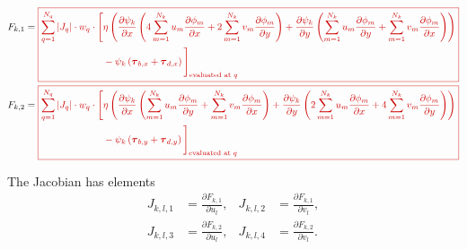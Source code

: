 \documentclass{amsart}
\newcommand{\diff}[2]{\ensuremath{\frac{\partial #1}{\partial #2}}}
\newcommand{\sumQ}{\ensuremath{\sum_{q = 1}^{N_q}}}
\newcommand{\diffbasisexpansion}[3]{\ensuremath{\sum_{#3 = 1}^{N_k} {#1}_{#3} \diff{\phi_{#3}}{#2} }}
\newcommand{\UX}{\diffbasisexpansion{u}{x}{m}}
\newcommand{\UY}{\diffbasisexpansion{u}{y}{m}}
\newcommand{\VX}{\diffbasisexpansion{v}{x}{m}}
\newcommand{\VY}{\diffbasisexpansion{v}{y}{m}}
\newcommand{\basalshearstress}[1]{\boldsymbol{\tau}_{b#1}}
\newcommand{\taubx}{\basalshearstress{,x}}
\newcommand{\tauby}{\basalshearstress{,y}}
\newcommand{\drivingstress}[1]{\boldsymbol{\tau}_{d#1}}
\newcommand{\taudx}{\drivingstress{,x}}
\newcommand{\taudy}{\drivingstress{,y}}
\newcommand{\highlight}[1]{{\color{red!80!black} \fbox{$ \displaystyle #1 $} }}
\begin{document}
\begin{align*}
  F_{k,1} &= \highlight{
            \begin{aligned}[t]
              \sumQ |J_q| \cdot w_q\cdot \Bigg[ &\eta \left(\diff{\psi_k}{x} \left(4 \UX + 2 \VY\right)
                + \diff{\psi_k}{y} \left(\UY + \VX\right)\right) \\
              & - \psi_k \left(\taubx + \taudx\right) \Bigg]_{\text{evaluated at } q}\\
            \end{aligned} }\\
  F_{k,2} &= \highlight{
            \begin{aligned}[t]
              \sumQ |J_q| \cdot w_q\cdot \Bigg[ &\eta \left(\diff{\psi_k}{x} \left(\UY + \VX\right)
                + \diff{\psi_k}{y} \left(2 \UX + 4 \VY\right) \right) \\
              & - \psi_k \left(\tauby + \taudy\right) \Bigg]_{\text{evaluated at } q}\\
            \end{aligned}}
\end{align*}

The Jacobian has elements
\begin{align*}
  J_{k,l,1} & = \diff{F_{k,1}}{u_l}, & J_{k,l,2} & = \diff{F_{k,1}}{v_l},\\
  J_{k,l,3} & = \diff{F_{k,2}}{u_l}, & J_{k,l,4} & = \diff{F_{k,2}}{v_l}.\\
\end{align*}
\end{document}
